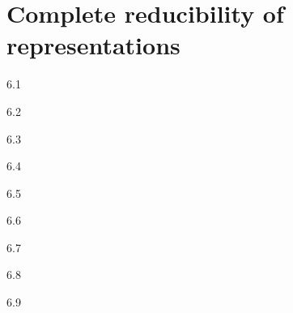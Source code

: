 \chapter{Complete reducibility of representations}

\begin{solution}{}{6.1}
    
\end{solution}

\begin{solution}{}{6.2}

\end{solution}

\begin{solution}{}{6.3}
    
\end{solution}

\begin{solution}{}{6.4}

\end{solution}

\begin{solution}{}{6.5}
    
\end{solution}

\begin{solution}{}{6.6}

\end{solution}

\begin{solution}{}{6.7}
    
\end{solution}

\begin{solution}{}{6.8}

\end{solution}

\begin{solution}{}{6.9}
    
\end{solution}